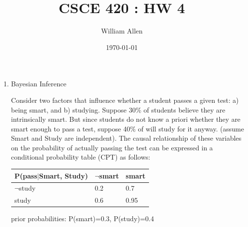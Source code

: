\documentclass{article}
\title{CSCE 420 : HW 4}
\author{William Allen}
\date{\today}
\theoremstyle{definition}
\newcommand{\<}{\langle}
\renewcommand{\>}{\rangle}
\begin{document}
\maketitle


\begin{enumerate}[label=\textbf{\Alph*}]
  \item Bayesian Inference


  \vspace{1.5em}
    Consider two factors that influence whether a student passes a given test: a) being smart, and b) studying. Suppose 30\% of students believe they are intrinsically smart. But since students do not know a priori whether they are smart enough to pass a test, suppose 40\% of will study for it anyway. (assume Smart and Study are independent). The causal relationship of these variables on the probability of actually passing the test can be expressed in a conditional probability table (CPT) as follows:
    
    \begin{table}[h!]
    \centering
    \begin{tabular}{|l|l|l|}
    \hline
    P(pass$|$Smart, Study) & $\neg$smart & smart \\ \hline
    $\neg$study          & 0.2         & 0.7   \\ \hline
    study                & 0.6         & 0.95  \\ \hline
    \end{tabular}
    \end{table}

    prior probabilities: P(smart)=0.3, P(study)=0.4


\end{enumerate}
\end{document}
